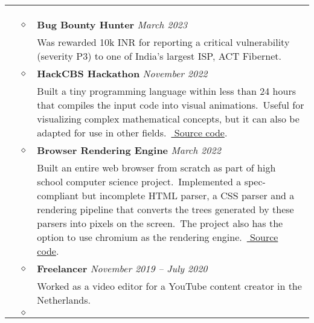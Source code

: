 \documentclass[11pt]{article}
\begin{document}
    \noindent
    \begin{tabularx}{\textwidth}{@{}b{90px} b{9px}@{} X@{}}
        \iftoggle{lines}{\\ \\ \hline \\}{}

        \lettrine[lines=1,loversize=-0.5]{E}XPERIENCE & $\diamond$ &

        \textbf{Bug Bounty Hunter} \hfill \textit{March 2023} \\ & &
        Was rewarded 10k INR for reporting a critical vulnerability (severity P3) to one of India's largest ISP, ACT
        Fibernet.\

        \\ & $\diamond$ &

        \textbf{HackCBS Hackathon} \hfill \textit{November 2022} \\ & &
        Built a tiny programming language within less than 24 hours that compiles the input code into visual
        animations.\ Useful for visualizing complex mathematical concepts, but it can also be adapted for use in
        other fields.\ \href{https://github.com/sujaldev/lyn}{\color{blue} Source code}.\

        \\ & $\diamond$ &

        \textbf{Browser Rendering Engine} \hfill \textit{March 2022} \\ & &
        Built an entire web browser from scratch as part of high school computer science project.\ Implemented a
        spec-compliant but incomplete HTML parser, a CSS parser and a rendering pipeline that converts the trees
        generated by these parsers into pixels on the screen.\ The project also has the option to use chromium as the
        rendering engine.\ \href{https://github.com/sujaldev/skylon}{\color{blue} Source code}.\

        \\ & $\diamond$ &

        \textbf{Freelancer} \hfill \textit{November 2019 -- July 2020} \\ & &
        Worked as a video editor for a YouTube content creator in the Netherlands.

        \\ & $\diamond$ &


\end{tabularx}
\end{document}
